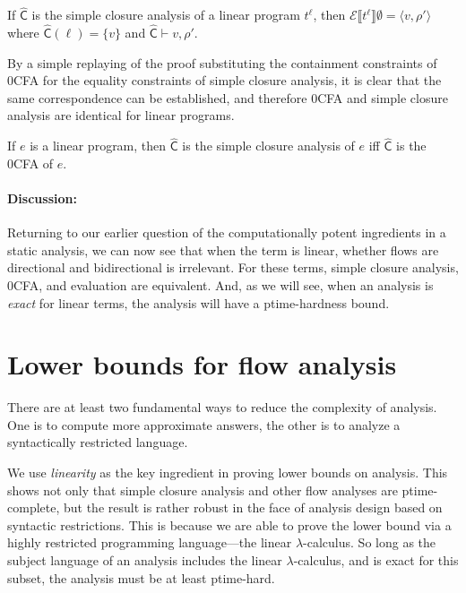 \documentclass{llncs}
\newcommand{\loves}{\ensuremath{\vdash}}
\newcommand\ev[1]{\ensuremath{\mathcal{E}\sem{#1}}}
\newcommand\sem[1]{\ensuremath{\llbracket #1 \rrbracket}}
\newcommand\ptime{{\sc ptime}}
\newcommand\cache{\widehat{\mathsf{C}}}
\begin{document}
\begin{corollary}\label{cor:normal}
If $\cache$ is the simple closure analysis of a linear program
$t^\ell$, then $\ev{t^\ell}\emptyset = \langle v,\rho'\rangle$ where
$\cache(\ell) = \{v\}$ and $\cache\loves v,\rho'$.
\end{corollary}

By a simple replaying of the proof substituting the containment
constraints of 0CFA for the equality constraints of simple closure
analysis, it is clear that the same correspondence can be established,
and therefore 0CFA and simple closure analysis are identical for
linear programs.

\begin{corollary}
If $e$ is a linear program, then $\cache$ is the simple closure
analysis of $e$ iff $\cache$ is the 0CFA of $e$.
\end{corollary}

\paragraph{Discussion:}

Returning to our earlier question of the computationally potent
ingredients in a static analysis, we can now see that when the term is
linear, whether flows are directional and bidirectional is irrelevant.
For these terms, simple closure analysis, 0CFA, and evaluation are
equivalent.  And, as we will see, when an analysis is {\em exact} for
linear terms, the analysis will have a \ptime-hardness bound.


\section{Lower bounds for flow analysis}
\label{sec:circuits}

There are at least two fundamental ways to reduce the complexity of
analysis.  One is to compute more approximate answers, the other is to
analyze a syntactically restricted language.

We use {\em linearity} as the key ingredient in proving lower bounds
on analysis.  This shows not only that simple closure analysis and
other flow analyses are \ptime-complete, but the result is rather
robust in the face of analysis design based on syntactic restrictions.
This is because we are able to prove the lower bound via a highly
restricted programming language---the linear $\lambda$-calculus.  So
long as the subject language of an analysis includes the linear
$\lambda$-calculus, and is exact for this subset, the analysis must be
at least \ptime-hard.
\end{document}
